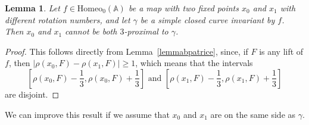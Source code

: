 \documentclass[12pt,a4paper]{amsart}
\newtheorem{lemma}[thm]{Lemma}
\theoremstyle{definition}
\theoremstyle{remark}
\newcommand{\A}{\mathbb{A}}
\begin{document}
\begin{lemma}
Let $f\in\mathrm{Homeo}_0(\A)$ be a map with two fixed points $x_0$ and $x_1$ with different rotation numbers, and let $\gamma$ be a simple closed curve invariant by $f$. Then $x_0$ and $x_1$ cannot be both $3$-proximal to $\gamma$.
\end{lemma}
\begin{proof}
This follows directly from Lemma~\ref{lemmabpatrice}, since, if $F$ is any lift of $f$, then $\mid\rho(x_0,F)-\rho(x_1,F)\mid\ge 1$, which means that the intervals 
$$\left[\rho(x_0,F)-\frac{1}{3}, \rho(x_0,F)+\frac{1}{3}\right]\mbox{ and }\left[\rho(x_1,F)-\frac{1}{3}, \rho(x_1,F)
+\frac{1}{3}\right]$$ 
are disjoint.
\end{proof}

We can improve this result if we assume that $x_0$ and $x_1$ are on the same side as $\gamma$.
\end{document}

